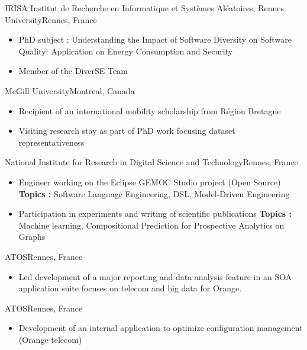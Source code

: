 
{IRISA Institut de Recherche en Informatique et Systèmes Aléatoires, Rennes University}{Rennes, France}
{
\begin{itemize}
    \item PhD subject : Understanding the Impact of Software Diversity on Software Quality: Application on Energy Consumption and Security
    \item Member of the DiverSE Team
\end{itemize}
 }

{McGill University}{Montreal, Canada}
{
\begin{itemize}
    \item Recipient of an international mobility scholarship from Région Bretagne
    \item Visiting research stay as part of PhD work focusing dataset representativeness
\end{itemize}
 }

 
{National Institute for Research in Digital Science and Technology}{Rennes, France}
{
\begin{itemize}
\item Engineer working on the Eclipse GEMOC Studio project (Open Source) 
\newline \textbf{Topics :} Software Language Engineering, DSL, Model-Driven Engineering
\item Participation in experiments and writing of scientific publications
\newline\textbf{Topics :} Machine learning, Compositional Prediction for Prospective Analytics on Graphs
\end{itemize}
}


{ATOS}{Rennes, France}
{
\begin{itemize}
    \item Led development of a major reporting and data analysis feature in an SOA application suite focuses on telecom and big data for Orange.
\end{itemize}
}
{ATOS}{Rennes, France}
{\begin{itemize}
\item Development of an internal application to optimize configuration management (Orange telecom)
\end{itemize}}